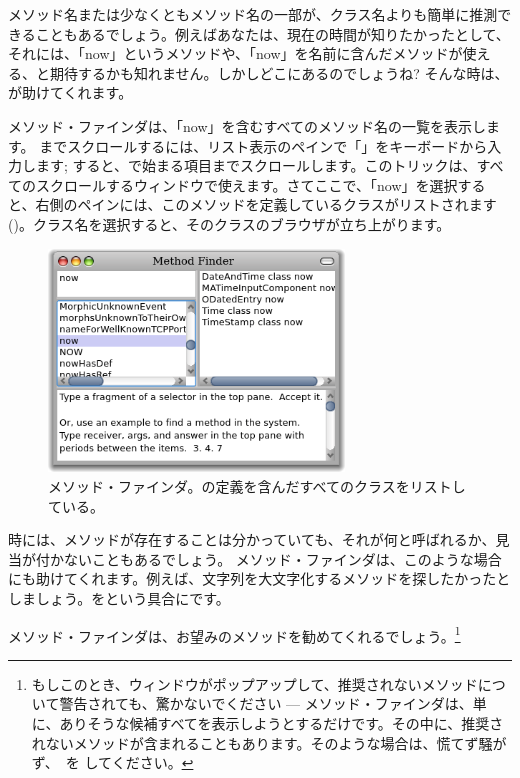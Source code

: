 \documentclass[a4paper,10pt,twoside]{book}
\begin{document}
メソッド名または少なくともメソッド名の一部が、クラス名よりも簡単に推測できることもあるでしょう。例えばあなたは、現在の時間が知りたかったとして、それには、「now」というメソッドや、「now」を名前に含んだメソッドが使える、と期待するかも知れません。しかしどこにあるのでしょうね?
そんな時は、が助けてくれます。

メソッド・ファインダは、「now」を含むすべてのメソッド名の一覧を表示します。
までスクロールするには、リスト表示のペインで「」をキーボードから入力します; すると、で始まる項目までスクロールします。このトリックは、すべてのスクロールするウィンドウで使えます。さてここで、「now」を選択すると、右側のペインには、このメソッドを定義しているクラスがリストされます()。クラス名を選択すると、そのクラスのブラウザが立ち上がります。

\begin{figure}[hbt]
\centerline {\includegraphics[width=0.7\textwidth]{methodFinder-now}}
\caption{メソッド・ファインダ。の定義を含んだすべてのクラスをリストしている。
}
\end{figure}

時には、メソッドが存在することは分かっていても、それが何と呼ばれるか、見当が付かないこともあるでしょう。
メソッド・ファインダは、このような場合にも助けてくれます。例えば、文字列を大文字化するメソッドを探したかったとしましょう。をという具合にです。

\noindent
メソッド・ファインダは、お望みのメソッドを勧めてくれるでしょう。\footnote{もしこのとき、ウィンドウがポップアップして、推奨されないメソッドについて警告されても、驚かないでください --- メソッド・ファインダは、単に、ありそうな候補すべてを表示しようとするだけです。その中に、推奨されないメソッドが含まれることもあります。そのような場合は、慌てず騒がず、~を \click してください。}
\end{document}
